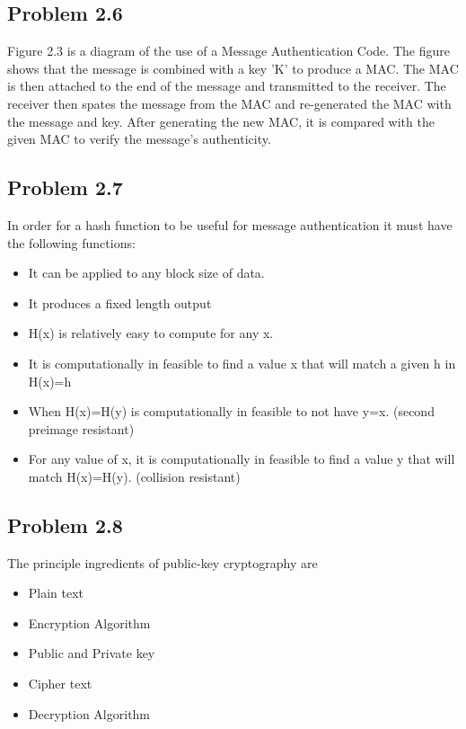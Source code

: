 \documentclass[14pt]{article}
\begin{document}
\subsection{Problem  2.6}
Figure 2.3 is a diagram of the use of a Message Authentication Code. The figure shows that the message is combined with a key 'K' to produce a MAC. The MAC is then attached to the end of the message and transmitted to the receiver. The receiver then spates the message from the MAC and re-generated the MAC with the message and key. After generating the new MAC, it is compared with the given MAC to verify the message's authenticity.

\subsection{Problem  2.7}
In order for a hash function to be useful for message authentication it must have the following functions:
\begin{itemize}
\item It can be applied to any block size of data.
\item It produces a fixed length output
\item H(x) is relatively easy to compute for any x.
\item It is computationally in feasible to find a value x that will match a given h in H(x)=h
\item When H(x)=H(y) is computationally in feasible to not have y=x. (second preimage resistant)
\item For any value of x, it is computationally in feasible to find a value y that will match H(x)=H(y). (collision resistant)
\end{itemize}

\subsection{Problem  2.8}
The principle ingredients of public-key cryptography are 
\begin{itemize}
\item Plain text
\item Encryption Algorithm
\item Public and Private key
\item Cipher text
\item Decryption Algorithm 
\end{itemize} 
\end{document}
